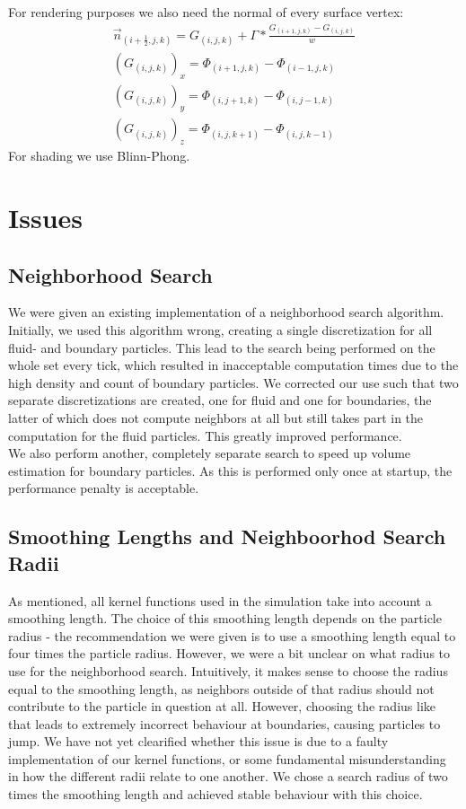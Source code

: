 \documentclass{ACGSeminar}
\begin{document}
For rendering purposes we also need the normal of every surface vertex:
\begin{equation} \label{eq:implicit_surface}
\begin{aligned}
\vec{n}_{(i+\frac{1}{2},j,k)} = G_{(i,j,k)} + \Gamma * \frac{G_{(i+1,j,k)}-G_{(i,j,k)}}{w}
\\
(G_{(i,j,k)})_x = \Phi_{(i+1,j,k)} - \Phi_{(i-1,j,k)} \\
(G_{(i,j,k)})_y = \Phi_{(i,j+1,k)} - \Phi_{(i,j-1,k)} \\
(G_{(i,j,k)})_z = \Phi_{(i,j,k+1)} - \Phi_{(i,j,k-1)}
\end{aligned} 
\end{equation}
For shading we use Blinn-Phong.

\section{Issues}
\subsection{Neighborhood Search}
We were given an existing implementation of a neighborhood search algorithm. Initially, we used this algorithm wrong, creating a single discretization for all fluid- and boundary particles. This lead to the search being performed on the whole set every tick, which resulted in inacceptable computation times due to the high density and count of boundary particles. We corrected our use such that two separate discretizations are created, one for fluid and one for boundaries, the latter of which does not compute neighbors at all but still takes part in the computation for the fluid particles. This greatly improved performance.\\
We also perform another, completely separate search to speed up volume estimation for boundary particles. As this is performed only once at startup, the performance penalty is acceptable.

\subsection{Smoothing Lengths and Neighboorhod Search Radii}
As mentioned, all kernel functions used in the simulation take into account a smoothing length. The choice of this smoothing length depends on the particle radius - the recommendation we were given is to use a smoothing length equal to four times the particle radius. However, we were a bit unclear on what radius to use for the neighborhood search. 
Intuitively, it makes sense to choose the radius equal to the smoothing length, as neighbors outside of that radius should not contribute to the particle in question at all. However, choosing the radius like that leads to extremely incorrect behaviour at boundaries, causing particles to jump. We have not yet clearified whether this issue is due to a faulty implementation of our kernel functions, or some fundamental misunderstanding in how the different radii relate to one another. We chose a search radius of two times the smoothing length and achieved stable behaviour with this choice.
\end{document}
